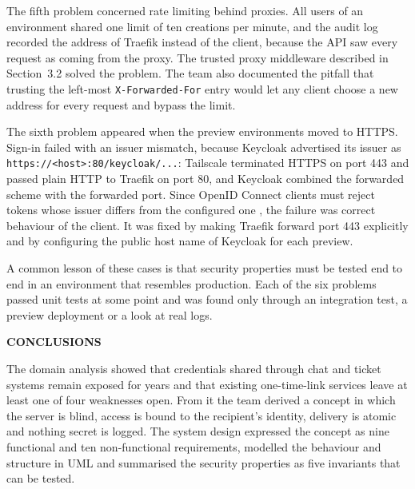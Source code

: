 \documentclass[12pt,a4paper]{article}
\numberwithin{equation}{section}
\numberwithin{figure}{section}
\numberwithin{table}{section}
\newcommand{\unnumberedsection}[1]{%
  \clearpage
  \phantomsection
  \addcontentsline{toc}{section}{#1}
  \begin{center}
    {\fontsize{13pt}{16pt}\bfseries\MakeUppercase{#1}\par}
  \end{center}
  \vspace{14pt}
}
\begin{document}
The fifth problem concerned rate limiting behind proxies. All users of an environment shared one limit of ten creations per minute, and the audit log recorded the address of Traefik instead of the client, because the API saw every request as coming from the proxy. The trusted proxy middleware described in Section~3.2 solved the problem. The team also documented the pitfall that trusting the left-most \texttt{X-Forwarded-For} entry would let any client choose a new address for every request and bypass the limit.

The sixth problem appeared when the preview environments moved to HTTPS. Sign-in failed with an issuer mismatch, because Keycloak advertised its issuer as \texttt{https://<host>:80/keycloak/...}: Tailscale terminated HTTPS on port 443 and passed plain HTTP to Traefik on port 80, and Keycloak combined the forwarded scheme with the forwarded port. Since OpenID Connect clients must reject tokens whose issuer differs from the configured one \cite{oidccore}, the failure was correct behaviour of the client. It was fixed by making Traefik forward port 443 explicitly and by configuring the public host name of Keycloak for each preview.

A common lesson of these cases is that security properties must be tested end to end in an environment that resembles production. Each of the six problems passed unit tests at some point and was found only through an integration test, a preview deployment or a look at real logs.

\unnumberedsection{CONCLUSIONS}

The domain analysis showed that credentials shared through chat and ticket systems remain exposed for years and that existing one-time-link services leave at least one of four weaknesses open. From it the team derived a concept in which the server is blind, access is bound to the recipient's identity, delivery is atomic and nothing secret is logged. The system design expressed the concept as nine functional and ten non-functional requirements, modelled the behaviour and structure in UML and summarised the security properties as five invariants that can be tested.
\end{document}
